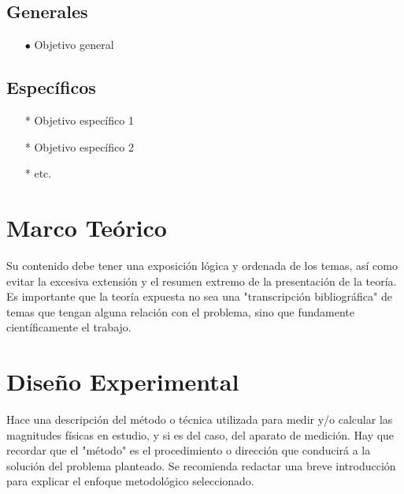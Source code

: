 \documentclass[osajnl,twocolumn,showpacs,superscriptaddress,10pt]{revtex4-1}
\begin{document}
\subsection{Generales}

\begin{itemize}
    \item[$\bullet$] Objetivo general
\end{itemize}

\subsection{Específicos}

\begin{itemize}
    \item[*] Objetivo específico 1
    \item[*] Objetivo específico 2
    \item[*] etc.
\end{itemize}
 
\section{Marco Teórico}

    Su contenido debe tener una exposición lógica y ordenada de los temas, así como evitar la excesiva extensión y el resumen extremo de la presentación de la teoría. Es importante que la teoría expuesta no sea una "transcripción bibliográfica" de temas que tengan alguna relación con el problema, sino que fundamente científicamente el trabajo.\\

\section{Diseño Experimental}

    Hace una descripción del método o técnica utilizada para medir y/o calcular las magnitudes físicas en estudio, y si es del caso, del aparato de medición. Hay que recordar que el "método" es el procedimiento o dirección que conducirá a la solución del problema planteado. Se recomienda redactar una breve introducción para explicar el enfoque metodológico seleccionado.\\
\end{document}
